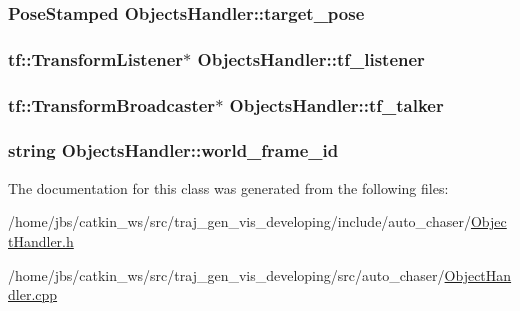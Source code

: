 \subsubsection[{\texorpdfstring{target\+\_\+pose}{target_pose}}]{\setlength{\rightskip}{0pt plus 5cm}Pose\+Stamped Objects\+Handler\+::target\+\_\+pose\hspace{0.3cm}{\ttfamily [private]}}\hypertarget{class_objects_handler_ad436bfd8b262f473f0e4ca92b3c3402b}{}\label{class_objects_handler_ad436bfd8b262f473f0e4ca92b3c3402b}
\subsubsection[{\texorpdfstring{tf\+\_\+listener}{tf_listener}}]{\setlength{\rightskip}{0pt plus 5cm}tf\+::\+Transform\+Listener$\ast$ Objects\+Handler\+::tf\+\_\+listener\hspace{0.3cm}{\ttfamily [private]}}\hypertarget{class_objects_handler_aea45bba31aa769008386100725bda66b}{}\label{class_objects_handler_aea45bba31aa769008386100725bda66b}
\subsubsection[{\texorpdfstring{tf\+\_\+talker}{tf_talker}}]{\setlength{\rightskip}{0pt plus 5cm}tf\+::\+Transform\+Broadcaster$\ast$ Objects\+Handler\+::tf\+\_\+talker\hspace{0.3cm}{\ttfamily [private]}}\hypertarget{class_objects_handler_af49de4eabb124e2ee6c9e12ebb31bca3}{}\label{class_objects_handler_af49de4eabb124e2ee6c9e12ebb31bca3}
\subsubsection[{\texorpdfstring{world\+\_\+frame\+\_\+id}{world_frame_id}}]{\setlength{\rightskip}{0pt plus 5cm}string Objects\+Handler\+::world\+\_\+frame\+\_\+id\hspace{0.3cm}{\ttfamily [private]}}\hypertarget{class_objects_handler_a1c0586ae7467bb8a3df8ad247ac7b10b}{}\label{class_objects_handler_a1c0586ae7467bb8a3df8ad247ac7b10b}


The documentation for this class was generated from the following files\+:\begin{DoxyCompactItemize}
\item 
/home/jbs/catkin\+\_\+ws/src/traj\+\_\+gen\+\_\+vis\+\_\+developing/include/auto\+\_\+chaser/\hyperlink{_object_handler_8h}{Object\+Handler.\+h}\item 
/home/jbs/catkin\+\_\+ws/src/traj\+\_\+gen\+\_\+vis\+\_\+developing/src/auto\+\_\+chaser/\hyperlink{_object_handler_8cpp}{Object\+Handler.\+cpp}\end{DoxyCompactItemize}
